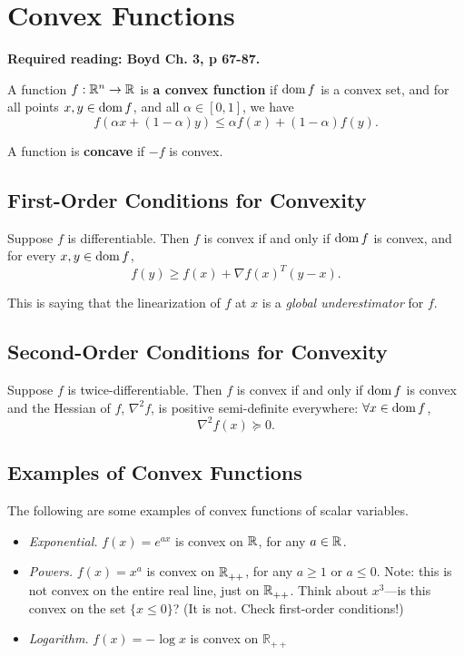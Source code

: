 \documentclass[12pt]{article}
\begin{document}
\pagebreak

\section{Convex Functions}

\textbf{Required reading: Boyd Ch. 3, p 67-87.}

A function $f : { {\mathbb R}^{n} } \to { {\mathbb R}^{} }$ is \textbf{a convex function} if $\mathop {\mathrm {dom}} f$ is a convex set, and for all points $x, y \in \mathop {\mathrm {dom}} f$, and all $\alpha \in [0,1]$, we have
%
\begin{equation*}
f( \alpha x + (1-\alpha) y ) \leq \alpha f(x) + (1-\alpha) f(y). 
\end{equation*}

A function is \textbf{concave} if $-f$ is convex.

\subsection{First-Order Conditions for Convexity}

Suppose $f$ is differentiable. Then $f$ is convex if and only if $\mathop {\mathrm {dom}} f$ is convex, and for every $x,y \in \mathop {\mathrm {dom}} f$, 
%
\begin{equation*}
f(y) \geq f(x) + \nabla f(x)^T (y - x).
\end{equation*}

This is saying that the linearization of $f$ at $x$ is a \textit{global underestimator} for $f$. 

\subsection{Second-Order Conditions for Convexity}

Suppose $f$ is twice-differentiable. Then $f$ is convex if and only if $\mathop {\mathrm {dom}} f$ is convex and the Hessian of $f$, $\nabla^2 f$, is positive semi-definite everywhere: $\forall x \in \mathop {\mathrm {dom}} f$, 
%
\begin{equation*}
\nabla^2 f(x) \succeq 0.
\end{equation*} 



\subsection{Examples of Convex Functions}

The following are some examples of convex functions of scalar variables.

\begin{itemize}
\item \textit{Exponential.} $f(x) = e^{ax}$ is convex on ${ {\mathbb R}^{} }$, for any $a \in { {\mathbb R}^{} }$. 
\item \textit{Powers.} $f(x) = x^a$ is convex on ${ {\mathbb R}_{++}^{} }$, for any $a \geq 1$ or $a \leq 0$. Note: this is not convex on the entire real line, just on ${ {\mathbb R}_{++}^{} }$. Think about $x^3$---is this convex on the set $\{x \leq 0\}$? (It is not. Check first-order conditions!)
\item \textit{Logarithm.} $f(x) = -\log x$ is convex on $\mathbb{R}_{++}$
\end{itemize}
\end{document}
